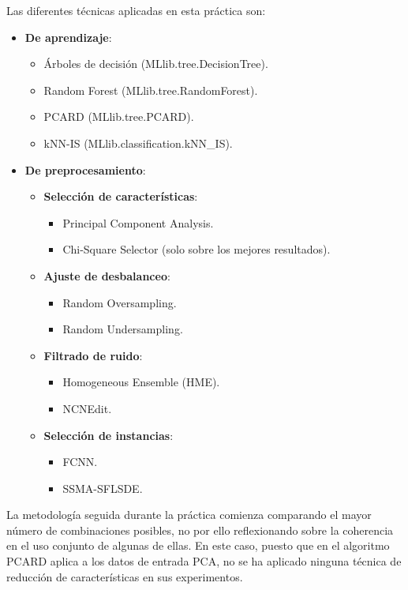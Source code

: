 Las diferentes técnicas aplicadas en esta práctica son:
\begin{itemize}
    \item \textbf{De aprendizaje}: \begin{itemize}
        \item Árboles de decisión (MLlib.tree.DecisionTree).
        \item Random Forest (MLlib.tree.RandomForest).
        \item PCARD (MLlib.tree.PCARD).
        \item kNN-IS (MLlib.classification.kNN\_IS).
    \end{itemize}
    \item \textbf{De preprocesamiento}: \begin{itemize}
        \item \textbf{Selección de características}: \begin{itemize}
            \item Principal Component Analysis.
            \item Chi-Square Selector (solo sobre los mejores resultados).
        \end{itemize}
        \item \textbf{Ajuste de desbalanceo}: \begin{itemize}
            \item Random Oversampling.
            \item Random Undersampling.
        \end{itemize}
        \item \textbf{Filtrado de ruido}: \begin{itemize}
            \item Homogeneous Ensemble (HME).
            \item NCNEdit.
        \end{itemize}
        \item \textbf{Selección de instancias}: \begin{itemize}
            \item FCNN.
            \item SSMA-SFLSDE.
        \end{itemize}
    \end{itemize}
\end{itemize}

La metodología seguida durante la práctica comienza comparando el mayor número de combinaciones posibles, no por ello reflexionando sobre la coherencia en el uso conjunto de algunas de ellas. En este caso, puesto que en el algoritmo PCARD aplica a los datos de entrada PCA, no se ha aplicado ninguna técnica de reducción de características en sus experimentos.

